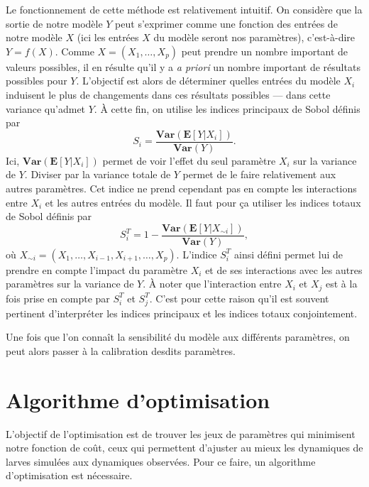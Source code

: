 Le fonctionnement de cette méthode est relativement intuitif.
On considère que la sortie de notre modèle $Y$ peut s'exprimer comme une fonction des entrées de notre modèle $X$ (ici les entrées $X$ du modèle seront nos paramètres), c'est-à-dire $Y = f(X)$.
Comme $X = \left( X_1, \ldots, X_p \right)$ peut prendre un nombre important de valeurs possibles, il en résulte qu'il y a \emph{a priori} un nombre important de résultats possibles pour $Y.$
L'objectif est alors de déterminer quelles entrées du modèle $X_i$ induisent le plus de changements dans ces résultats possibles --- dans cette variance qu'admet $Y.$
À cette fin, on utilise les indices principaux de Sobol définis par
\[
S_i = \frac{\textbf{Var}\!\left( \mathbf{E}\!\left[Y|X_i\right] \right)}{\textbf{Var}\!\left( Y \right)}.
\]
Ici, $\textbf{Var}\!\left( \mathbf{E}\left[Y|X_i\right] \right)$ permet de voir l'effet du seul paramètre $X_i$ sur la variance de $Y.$
Diviser par la variance totale de $Y$ permet de le faire relativement aux autres paramètres.
Cet indice ne prend cependant pas en compte les interactions entre $X_i$ et les autres entrées du modèle. 
Il faut pour ça utiliser les indices totaux de Sobol définis par
\[
S^T_i = 1 - \frac{\textbf{Var}\!\left( \mathbf{E}\!\left[Y|X_{\sim i}\right] \right)}{\textbf{Var}\!\left( Y \right)},
\]
où $X_{\sim i} = \left(X_1, \ldots, X_{i-1}, X_{i+1}, \ldots, X_p \right)$.
L'indice $S^T_i$ ainsi défini permet lui de prendre en compte l'impact du paramètre $X_i$ et de ses interactions avec les autres paramètres sur la variance de $Y$.
À noter que l'interaction entre $X_i$ et $X_j$ est à la fois prise en compte par $S^T_i$ et $S^T_j$.
C'est pour cette raison qu'il est souvent pertinent d'interpréter les indices principaux et les indices totaux conjointement.

Une fois que l'on connaît la sensibilité du modèle aux différents paramètres, on peut alors passer à la calibration desdits paramètres.


\section{Algorithme d'optimisation}

L'objectif de l'optimisation est de trouver les jeux de paramètres qui minimisent notre fonction de coût, ceux qui permettent d'ajuster au mieux les dynamiques de larves simulées aux dynamiques observées.
Pour ce faire, un algorithme d'optimisation est nécessaire.


